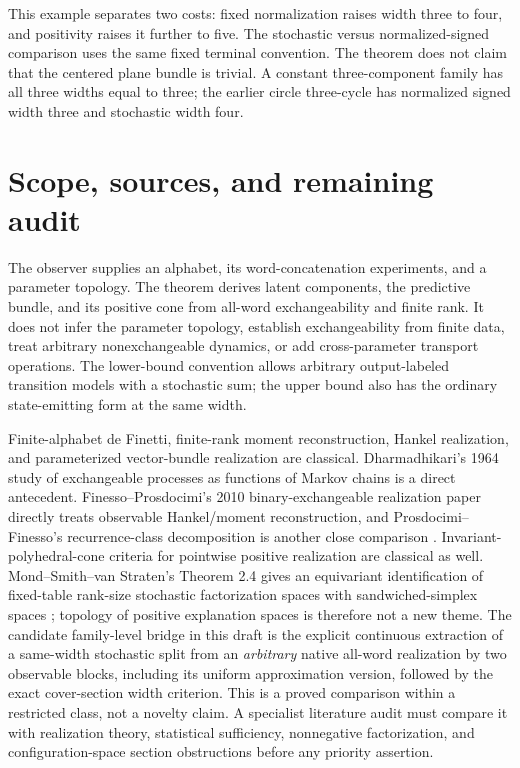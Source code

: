\documentclass[11pt]{article}
\theoremstyle{remark}\newtheorem{remark}[theorem]{Remark}
\begin{document}
This example separates two costs: fixed normalization raises width three to four, and positivity raises it further to five. The stochastic versus normalized-signed comparison uses the same fixed terminal convention. The theorem does not claim that the centered plane bundle is trivial. A constant three-component family has all three widths equal to three; the earlier circle three-cycle has normalized signed width three and stochastic width four.

\section{Scope, sources, and remaining audit}
The observer supplies an alphabet, its word-concatenation experiments, and a parameter topology. The theorem derives latent components, the predictive bundle, and its positive cone from all-word exchangeability and finite rank. It does not infer the parameter topology, establish exchangeability from finite data, treat arbitrary nonexchangeable dynamics, or add cross-parameter transport operations. The lower-bound convention allows arbitrary output-labeled transition models with a stochastic sum; the upper bound also has the ordinary state-emitting form at the same width.

Finite-alphabet de Finetti, finite-rank moment reconstruction, Hankel realization, and parameterized vector-bundle realization are classical. Dharmadhikari's 1964 study of exchangeable processes as functions of Markov chains is a direct antecedent. Finesso--Prosdocimi's 2010 binary-exchangeable realization paper directly treats observable Hankel/moment reconstruction, and Prosdocimi--Finesso's recurrence-class decomposition is another close comparison \cite{Dharmadhikari,FP,PF}. Invariant-polyhedral-cone criteria for pointwise positive realization are classical as well. Mond--Smith--van Straten's Theorem 2.4 gives an equivariant identification of fixed-table rank-size stochastic factorization spaces with sandwiched-simplex spaces \cite{MSV}; topology of positive explanation spaces is therefore not a new theme. The candidate family-level bridge in this draft is the explicit continuous extraction of a same-width stochastic split from an \emph{arbitrary} native all-word realization by two observable blocks, including its uniform approximation version, followed by the exact cover-section width criterion. This is a proved comparison within a restricted class, not a novelty claim. A specialist literature audit must compare it with realization theory, statistical sufficiency, nonnegative factorization, and configuration-space section obstructions before any priority assertion.
\end{document}
